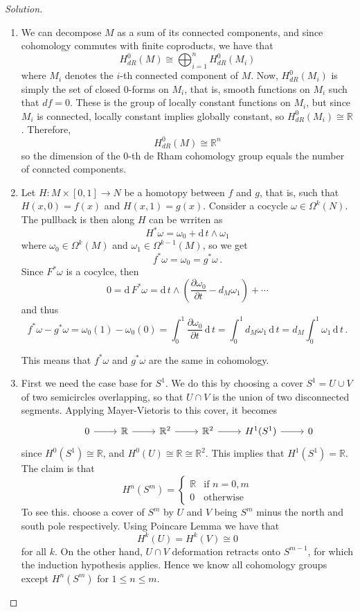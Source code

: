 \documentclass[a4paper,12pt]{article}
\newenvironment{solution}
  {\renewcommand\qedsymbol{$\blacksquare$}\begin{proof}[Solution]}
  {\end{proof}}
\theoremstyle{definition}
\begin{document}
\begin{solution}
\begin{enumerate}[label = \alph*)]
    \item We can decompose $M$ as a sum of its connected components, and since cohomology commutes with finite coproducts, we have that 
    $$H^0_{dR}(M) \cong \bigoplus_{i = 1}^n H^0_{dR}(M_i)$$
    where $M_i$ denotes the $i$-th connected component of $M$. Now, $H^0_{dR}(M_i)$ is simply the set of closed 0-forms on $M_i$, that is, smooth functions on $M_i$ such that $d f = 0$. These is the group of locally constant functions on $M_i$, but since $M_i$ is connected, locally constant implies globally constant, so $H^0_{dR}(M_i) \cong \mathbb{R}$. Therefore, 
    $$H^0_{dR}(M) \cong \mathbb{R}^n$$
    so the dimension of the 0-th de Rham cohomology group equals the number of conncted components. 
    \item Let $H \colon M \times [0,1] \to N$ be a homotopy between $f$ and $g$, that is, such that $H(x,0) = f(x)$ and $H(x,1) = g(x)$. Consider a cocycle $\omega \in \Omega^k(N)$. The pullback is then along $H$ can be wrriten as 
    $$H^* \omega = \omega_0 + \mathrm{d}\, t \land \omega_1$$
    where $\omega_0 \in \Omega^k(M)$ and $\omega_1 \in \Omega^{k-1}(M)$, so we get
    $$f^*\omega = \omega_0 = g^* \omega \, .$$
    Since $F^*\omega$ is a cocylce, then 
    $$0 = \mathrm{d}\, F^* \omega = \mathrm{d} \, t \land \left( \frac{\partial \omega_0}{\partial t} - d_M \omega_1 \right) + \cdots $$
    and thus 
    $$f^*\omega - g^*\omega = \omega_0(1) - \omega_0(0) = \int_0^1 \frac{\partial \omega_0}{\partial t} \, \mathrm{d}\, t = \int_0^1 d_M \omega_1 \, \mathrm{d}\, t = d_M \int_0^1 \omega_1\, \mathrm{d}\, t \, .$$
    
    This means that $f^*\omega$ and $g^*\omega$ are the same in cohomology. 
    \item First we need the case base for $S^1$. We do this by choosing a cover $S^1 = U \cup V$ of two semicircles overlapping, so that $U \cap V$ is the union of two disconnected segments. Applying Mayer-Vietoris to this cover, it becomes 
    \begin{equation*}
        \begin{tikzcd}
        & 0 \arrow[r] & \mathbb{R} \arrow[r] & \mathbb{R}^2 \arrow[r]& \mathbb{R}^2 \arrow[r] & H^1(S^1) \arrow[r] & 0 
        \end{tikzcd}
    \end{equation*}
    since $H^0(S^1) \cong \mathbb{R}$, and $H^0(U) \cong \mathbb{R} \cong \mathbb{R}^2$. This implies that $H^1(S^1) = \mathbb{R}$. 
    The claim is that 
    $$H^n(S^m) = 
    \begin{cases}
    \mathbb{R} & \text{if $n = 0, m$}\\
    0 & \text{otherwise}
    \end{cases}$$
    To see this. choose a cover of $S^m$ by $U$ and $V$ being $S^m$ minus the north and south pole respectively. Using Poincare Lemma we have that 
    $$H^k(U) = H^k(V) \cong 0$$
    for all $k$. On the other hand, $U \cap V$ deformation retracts onto $S^{m-1}$, for which the induction hypothesis applies. Hence we know all cohomology groups except $H^n(S^m)$ for $1 \leq n \leq m$. 
    

\end{enumerate}
\end{solution}
\end{document}
